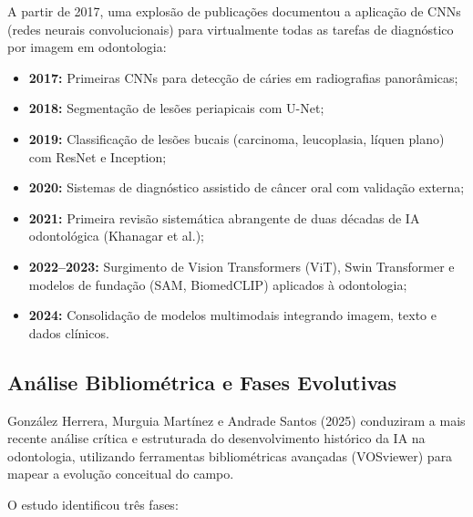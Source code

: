 A partir de 2017, uma explosão de publicações documentou a aplicação de CNNs (redes neurais convolucionais) para virtualmente todas as tarefas de diagnóstico por imagem em odontologia:

\begin{itemize}
    \item \textbf{2017:} Primeiras CNNs para detecção de cáries em radiografias panorâmicas;
    \item \textbf{2018:} Segmentação de lesões periapicais com U-Net;
    \item \textbf{2019:} Classificação de lesões bucais (carcinoma, leucoplasia, líquen plano) com ResNet e Inception;
    \item \textbf{2020:} Sistemas de diagnóstico assistido de câncer oral com validação externa;
    \item \textbf{2021:} Primeira revisão sistemática abrangente de duas décadas de IA odontológica (Khanagar et al.);
    \item \textbf{2022--2023:} Surgimento de Vision Transformers (ViT), Swin Transformer e modelos de fundação (SAM, BiomedCLIP) aplicados à odontologia;
    \item \textbf{2024:} Consolidação de modelos multimodais integrando imagem, texto e dados clínicos.
\end{itemize}

\subsection{Análise Bibliométrica e Fases Evolutivas}

González Herrera, Murguia Martínez e Andrade Santos (2025) \cite{ODT-005} conduziram a mais recente análise crítica e estruturada do desenvolvimento histórico da IA na odontologia, utilizando ferramentas bibliométricas avançadas (VOSviewer) para mapear a evolução conceitual do campo.


O estudo identificou três fases:

